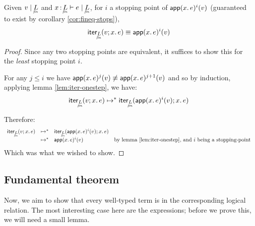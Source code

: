\documentclass{article}
\begin{document}
\begin{theorem}\label{thm:iter-stops}
  Given $\lr{\fineq{L}}{v}$ and $\lrcx{x\of\fineq{L}}{\fineq{L}}{e}$, for $i$ a
  stopping point of $\mathsf{app}(x.\,{e})^{i}(v)$ (guaranteed to exist by corollary
  \ref{cor:fineq-stops}),
  \[ \iter{\fineq{L}}{v}{x}{e} \equiv \nthapp{x}{e}{i}{v} \]
\end{theorem}
\begin{proof}
  Since any two stopping points are equivalent, it suffices to show this for the
  \emph{least} stopping point $i$.

  For any $j \le i$ we have $\mathsf{app}(x.\,{e})^{j}(v) \not\equiv
  \mathsf{app}(x.\,{e})^{j+1}(v)$ and so by induction, applying lemma
  \ref{lem:iter-onestep}, we have:
  \[
  \iter{\fineq{L}}{v}{x}{e} \steps
  \iter{\fineq{L}}{\nthapp{x}{e}{i}{v}}{x}{e}
  \]

  Therefore:
  \[
  \begin{array}{rlll}
    \iter{\fineq{L}}{v}{x}{e}
    &\steps& \iter{\fineq{L}}{\nthapp{x}{e}{i}{v}}{x}{e}\\
    &\steps& \nthapp{x}{e}{i}{v}
    & \text{by lemma \ref{lem:iter-onestep}, and $i$ being a stopping-point}
  \end{array}
  \]
  Which was what we wished to show.
\end{proof}


\subsection{Fundamental theorem}

Now, we aim to show that every well-typed term is in the corresponding logical
relation. The most interesting case here are the  expressions; before we
prove this, we will need a small lemma.
\end{document}
